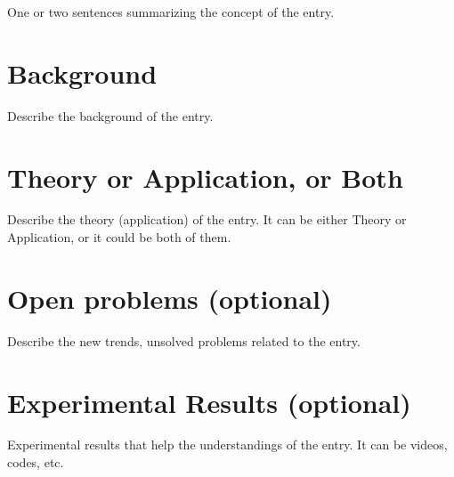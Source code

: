 \documentclass{llncs}
\begin{document}
One or two sentences summarizing the concept of the entry.

\section{Background}

Describe the background of the entry.

\section{Theory or Application, or Both}

Describe the theory (application) of the entry. It can be either 
Theory or Application, or it could be both of them.

\section{Open problems (optional)}

Describe the new trends, unsolved problems related to the entry.

\section{Experimental Results (optional)}

Experimental results that help the understandings of the entry. It 
can be videos, codes, etc.

%


\end{document}

